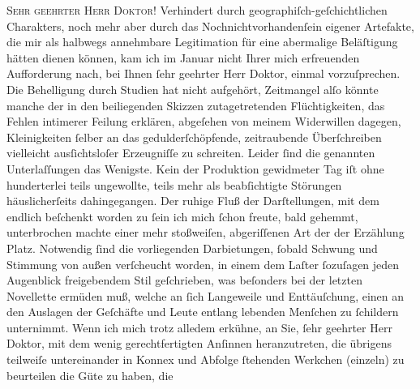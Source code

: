 \pstart\center{}\textsc{Sehr geehrter Herr Doktor!}\pend\vspace{0.5em}
\pstart
           Verhindert durch \label{K_L01792-1v}\label{K_L01792-1} geographiſch-geſchichtlichen Charakters, noch mehr aber durch
               das Nochnichtvorhandenſein eigener Artefakte, die mir als halbwegs annehmbare
               Legitimation für eine abermalige Beläſtigung hätten dienen können, kam ich im
                  Januar nicht Ihrer mich erfreuenden Aufforderung nach, bei Ihnen ſehr
               geehrter Herr Doktor, einmal vorzuſprechen. Die Behelligung durch Studien hat nicht
               aufgehört, Zeitmangel alſo könnte manche der in den beiliegenden Skizzen
               zutagetretenden Flüchtigkeiten, das Fehlen intimerer Feilung erklären, {\pb}abgeſehen von meinem Widerwillen dagegen,
               Kleinigkeiten ſelber an das gedulderſchöpfende, zeitraubende Überſchreiben vielleicht
               ausſichtsloſer Erzeugniſſe zu schreiten. Leider ſind die genannten Unterlaſſungen das
               Wenigste. Kein der Produktion gewidmeter Tag iſt ohne hunderterlei teils ungewollte,
               teils mehr als beabſichtigte Störungen häuslicherſeits dahingegangen. Der ruhige Fluß
               der Darſtellungen, mit dem endlich beſchenkt worden zu ſein ich mich ſchon freute,
               bald gehemmt, unterbrochen machte einer mehr stoßweiſen, abgeriſſenen Art der
               der Erzählung Platz. Notwendig ſind die vorliegenden Darbietungen, ſobald
               Schwung {\pb}und Stimmung von außen
               verſcheucht worden, in einem dem Laſter ſozuſagen jeden Augenblick freigebendem Stil
               geſchrieben, was beſonders bei der letzten Novellette ermüden muß, welche an ſich Langeweile und
               Enttäuſchung, einen an den Auslagen der Geſchäfte und Leute entlang lebenden Menſchen
               zu ſchildern unternimmt. Wenn ich mich trotz alledem erkühne, an Sie, ſehr geehrter
               Herr Doktor, mit dem wenig gerechtfertigten Anſinnen heranzutreten, die übrigens
               teilweiſe untereinander in Konnex und Abfolge ſtehenden Werkchen (einzeln) zu
               beurteilen die Güte zu haben, {\pb}die
